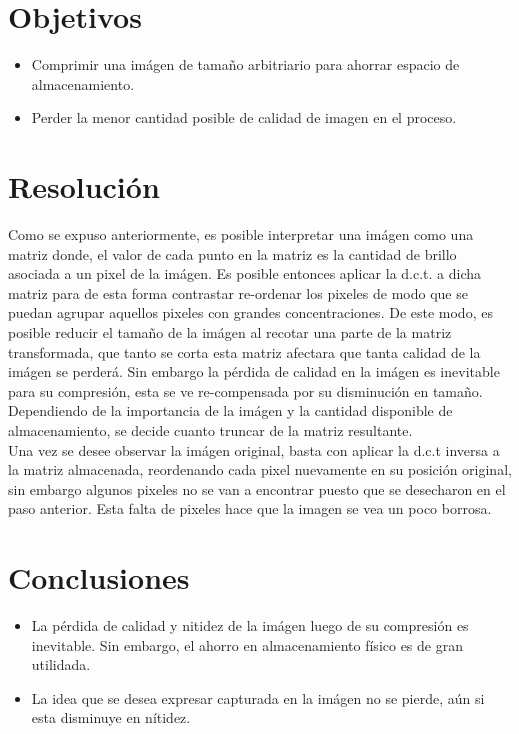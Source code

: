 \documentclass{article}
\begin{document}
\section{Objetivos}
	\begin{itemize}
		\item Comprimir una imágen de tamaño
			arbitriario para ahorrar espacio 
			de almacenamiento.
		\item Perder la menor cantidad posible de calidad
			de imagen en el proceso.
	\end{itemize}
\section{Resolución}
Como se expuso anteriormente, es posible interpretar una imágen
como una matriz donde, el valor de cada punto en la matriz 
es la cantidad de brillo asociada a un pixel de la imágen.
Es posible entonces aplicar la d.c.t. a dicha matriz
para de esta forma contrastar re-ordenar los pixeles de modo
que se puedan agrupar aquellos pixeles con grandes concentraciones.
De este modo, es posible reducir el tamaño de la imágen al recotar
una parte de la matriz transformada, que tanto se corta esta matriz
afectara que tanta calidad de la imágen se perderá. Sin embargo
la pérdida de calidad en la imágen es inevitable para su compresión, 
esta se ve re-compensada por su disminución en tamaño. Dependiendo 
de la importancia de la imágen y la cantidad disponible de 
almacenamiento, se decide cuanto truncar de la matriz resultante. \\
Una vez se desee observar la imágen original, basta
con aplicar la d.c.t inversa a la matriz almacenada, reordenando 
cada pixel nuevamente en su posición original, sin embargo algunos
pixeles no se van a encontrar puesto que se desecharon en el paso 
anterior. Esta falta de pixeles hace que la imagen se vea un 
poco borrosa.
\section{Conclusiones}
\begin{itemize}
	\item La pérdida de calidad y nitidez de la imágen luego de 
	su compresión es inevitable. Sin embargo, el ahorro en 
	almacenamiento físico es de gran utilidada.
\item La idea que se desea expresar capturada en la imágen no 
	se pierde, aún si esta disminuye en nítidez.
\end{itemize}
	
\end{document}
